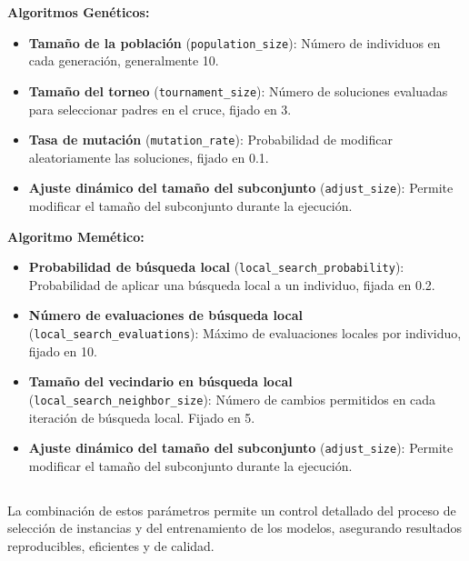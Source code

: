 \textbf{Algoritmos Genéticos:}
\begin{itemize}
    \item \textbf{Tamaño de la población} (\texttt{population\_size}): Número de individuos en cada generación, generalmente 10.
    \item \textbf{Tamaño del torneo} (\texttt{tournament\_size}): Número de soluciones evaluadas para seleccionar padres en el cruce, fijado en 3.
    \item \textbf{Tasa de mutación} (\texttt{mutation\_rate}): Probabilidad de modificar aleatoriamente las soluciones, fijado en 0.1.
    \item \textbf{Ajuste dinámico del tamaño del subconjunto} (\texttt{adjust\_size}): Permite modificar el tamaño del subconjunto durante la ejecución.
\end{itemize}

\textbf{Algoritmo Memético:}
\begin{itemize}
    \item \textbf{Probabilidad de búsqueda local} (\texttt{local\_search\_probability}): Probabilidad de aplicar una búsqueda local a un individuo, fijada en 0.2.
    \item \textbf{Número de evaluaciones de búsqueda local} \\(\texttt{local\_search\_evaluations}): Máximo de evaluaciones locales por individuo, fijado en 10.
    \item \textbf{Tamaño del vecindario en búsqueda local} \\(\texttt{local\_search\_neighbor\_size}): Número de cambios permitidos en cada iteración de búsqueda local.
          Fijado en 5.
    \item \textbf{Ajuste dinámico del tamaño del subconjunto} (\texttt{adjust\_size}): Permite modificar el tamaño del subconjunto durante la ejecución.
\end{itemize}

\subsection*{}
La combinación de estos parámetros permite un control detallado del proceso de selección de instancias y del entrenamiento de los modelos,
asegurando resultados reproducibles, eficientes y de calidad.
